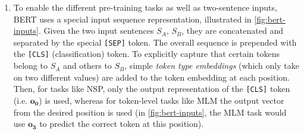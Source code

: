 \documentclass[bsc,frontabs,singlespacing,parskip,deptreport]{infthesis}
\begin{document}
{{{\begin{enumerate}
        \item To enable the different pre-training tasks as well as two-sentence inputs, BERT uses a special input sequence representation, illustrated in \autoref{fig:bert-inputs}. Given the two input sentences $S_A$, $S_B$, they are concatenated and separated by the special \verb|[SEP]| token. The overall sequence is prepended with the \verb|[CLS]| (classification) token. To explicitly capture that certain tokens belong to $S_A$ and others to $S_B$, simple \textit{token type embeddings} (which only take on two different values) are added to the token embedding at each position. Then, for tasks like NSP, only the output representation of the \verb|[CLS]| token (i.e. $\bm{o_0}$) is used, whereas for token-level tasks like MLM the output vector from the desired position is used (in \autoref{fig:bert-inputs}, the MLM task would use $\bm{o_3}$ to predict the correct token at this position).
      \end{enumerate}

}}}
\end{document}
